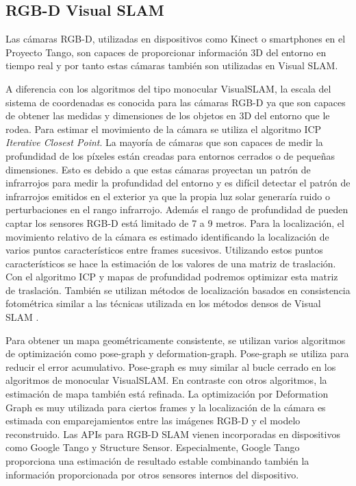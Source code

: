 \subsection{RGB-D Visual SLAM}
Las cámaras RGB-D, utilizadas en dispositivos como Kinect o smartphones en el Proyecto Tango, son capaces de proporcionar información 3D del entorno en tiempo real y por tanto estas cámaras también son utilizadas en Visual SLAM.

A diferencia con los algoritmos del tipo monocular VisualSLAM, la escala del sistema de coordenadas es conocida para las cámaras RGB-D ya que son capaces de obtener las medidas y dimensiones de los objetos en 3D del entorno que le rodea.
Para estimar el movimiento de la cámara se utiliza el algoritmo ICP \textit{Iterative Closest Point}.
La mayoría de cámaras que son capaces de medir la profundidad de los píxeles están creadas para entornos cerrados o de pequeñas dimensiones. Esto es debido a que estas cámaras proyectan un patrón de infrarrojos para medir la profundidad del entorno y es difícil detectar el patrón de infrarrojos emitidos en el exterior ya que la propia luz solar generaría ruido o perturbaciones en el rango infrarrojo. Además el rango de profundidad de pueden captar los sensores RGB-D está limitado de 7 a 9 metros.
Para la localización, el movimiento relativo de la cámara es estimado identificando la localización de varios puntos característicos entre frames sucesivos. Utilizando estos puntos característicos se hace la estimación de los valores de una matriz de traslación. Con el algoritmo ICP y mapas de profundidad podremos optimizar esta matriz de traslación. También se utilizan métodos de localización basados en consistencia fotométrica similar a las técnicas utilizada en los métodos densos de Visual SLAM \cite{Takafumi17}.

Para obtener un mapa geométricamente consistente, se utilizan varios algoritmos de optimización como pose-graph y deformation-graph.
Pose-graph se utiliza para reducir el error acumulativo. Pose-graph es muy similar al bucle cerrado en los algoritmos de monocular VisualSLAM.
En contraste con otros algoritmos, la estimación de mapa también está refinada. La optimización por Deformation Graph es muy utilizada para ciertos frames y la localización de la cámara es estimada con emparejamientos entre las imágenes RGB-D y el modelo reconstruido.
Las APIs para RGB-D SLAM vienen incorporadas en dispositivos como Google Tango y Structure Sensor. Especialmente, Google Tango proporciona una estimación de resultado estable combinando también la información proporcionada por otros sensores internos del dispositivo.

